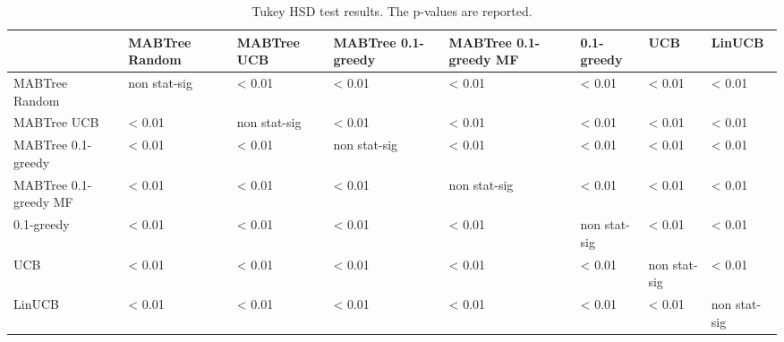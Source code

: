 \begin{table}[t]
\centering
\caption{Tukey HSD test results. The p-values are reported.}
\label{tab:tukey_hsd}
\begin{tabular}{llllllll}
\toprule
 & MABTree Random & MABTree UCB & MABTree 0.1-greedy & MABTree 0.1-greedy MF & 0.1-greedy & UCB & LinUCB \\
\midrule
MABTree Random & non stat-sig & < 0.01 & < 0.01 & < 0.01 & < 0.01 & < 0.01 & < 0.01 \\
MABTree UCB & < 0.01 & non stat-sig & < 0.01 & < 0.01 & < 0.01 & < 0.01 & < 0.01 \\
MABTree 0.1-greedy & < 0.01 & < 0.01 & non stat-sig & < 0.01 & < 0.01 & < 0.01 & < 0.01 \\
MABTree 0.1-greedy MF & < 0.01 & < 0.01 & < 0.01 & non stat-sig & < 0.01 & < 0.01 & < 0.01 \\
0.1-greedy & < 0.01 & < 0.01 & < 0.01 & < 0.01 & non stat-sig & < 0.01 & < 0.01 \\
UCB & < 0.01 & < 0.01 & < 0.01 & < 0.01 & < 0.01 & non stat-sig & < 0.01 \\
LinUCB & < 0.01 & < 0.01 & < 0.01 & < 0.01 & < 0.01 & < 0.01 & non stat-sig \\
\bottomrule
\end{tabular}
\end{table}
